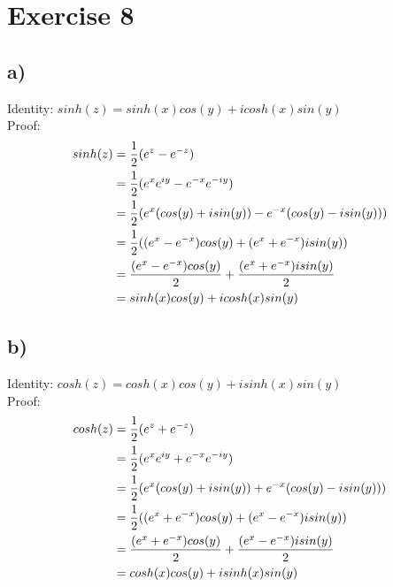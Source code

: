 \documentclass[notitlepage]{article}
\begin{document}
\section*{Exercise 8}
\subsection*{a)}
    Identity: $sinh(z) = sinh(x)cos(y) + icosh(x)sin(y)$ \\
    Proof: \\
\begin{equation}
    \begin{aligned}
        sinh(z)     &= \frac{1}{2}(e^z-e^{-z}) \notag \\
                    &= \frac{1}{2}(e^xe^{iy}-e^{-x}e^{-iy}) \\
                    &= \frac{1}{2}(e^x(cos(y)+isin(y)) - e^{-x}(cos(y)-isin(y))) \\
                    &= \frac{1}{2}((e^x-e^{-x})cos(y)+(e^x+e^{-x})isin(y)) \\
                    &= \frac{(e^x-e^{-x})cos(y)}{2} + \frac{(e^x+e^{-x})isin(y)}{2} \\
                    &= sinh(x)cos(y) + icosh(x)sin(y)
    \end{aligned}
\end{equation}

\subsection*{b)}
    Identity: $cosh(z) = cosh(x)cos(y) + isinh(x)sin(y)$ \\
    Proof: \\
\begin{equation}
    \begin{aligned}
        cosh(z)     &= \frac{1}{2}(e^z+e^{-z})\notag \\
                    &= \frac{1}{2}(e^xe^{iy}+e^{-x}e^{-iy}) \\
                    &= \frac{1}{2}(e^x(cos(y)+isin(y)) + e^{-x}(cos(y)-isin(y))) \\
                    &= \frac{1}{2}((e^x+e^{-x})cos(y)+(e^x-e^{-x})isin(y)) \\
                    &= \frac{(e^x+e^{-x})cos(y)}{2} + \frac{(e^x-e^{-x})isin(y)}{2} \\
                    &= cosh(x)cos(y) + isinh(x)sin(y) 
    \end{aligned}
\end{equation}
\end{document}
